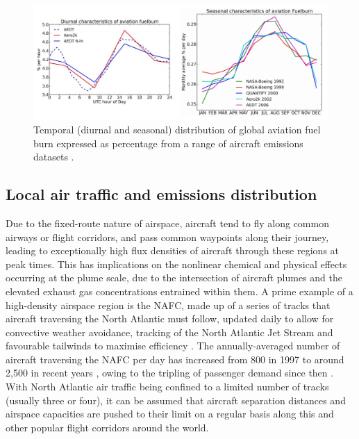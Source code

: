 \begin{figure}[H]
  \centering
  \includegraphics[width=0.8\linewidth]{FB_dist_temporal.pdf}
  \caption{Temporal (diurnal and seasonal) distribution of global aviation fuel burn expressed as percentage from a range of aircraft emissions datasets \cite{Olsen2013}.}
  \label{FB_dist_temporal}
\end{figure}

\subsection{Local air traffic and emissions distribution}
Due to the fixed-route nature of airspace, aircraft tend to fly along common airways or flight corridors, and pass common waypoints along their journey, leading to exceptionally high flux densities of aircraft through these regions at peak times. This has implications on the nonlinear chemical and physical effects occurring at the plume scale, due to the intersection of aircraft plumes and the elevated exhaust gas concentrations entrained within them. A prime example of a high-density airspace region is the NAFC, made up of a series of tracks that aircraft traversing the North Atlantic must follow, updated daily to allow for convective weather avoidance, tracking of the North Atlantic Jet Stream and favourable tailwinds to maximise efficiency \cite{NOTAMS}. The annually-averaged number of aircraft traversing the NAFC per day has increased from 800 in 1997 \cite{Karcher1998} to around 2,500 in recent years \cite{NATS_NAFC}, owing to the tripling of passenger demand since then \cite{World_databank}. With North Atlantic air traffic being confined to a limited number of tracks (usually three or four), it can be assumed that aircraft separation distances and airspace capacities are pushed to their limit on a regular basis along this and other popular flight corridors around the world.


